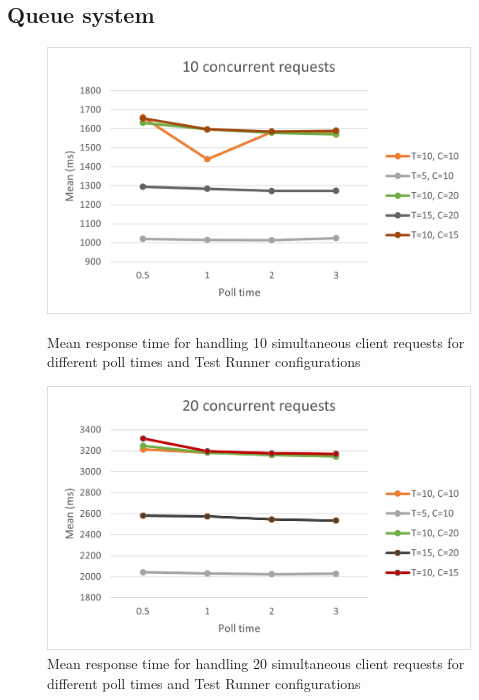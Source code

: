 \subsection{Queue system}
\begin{figure}[!tbp]
  \centering
  \begin{minipage}[t]{0.4\textwidth}
    \includegraphics[scale=0.65]{images/10.png}
    \caption{Mean response time for handling 10 simultaneous client requests for different poll times and Test Runner configurations}
    \label{fig:resultstart}
  \end{minipage}
  \hfill
  \begin{minipage}[t]{0.4\textwidth}
    \centering
    \includegraphics[scale=0.65]{images/20.png}
    \caption{Mean response time for handling 20 simultaneous client requests for different poll times and Test Runner configurations}
  \end{minipage}
  \begin{minipage}[t]{0.4\textwidth}

\end{minipage}
\end{figure}
